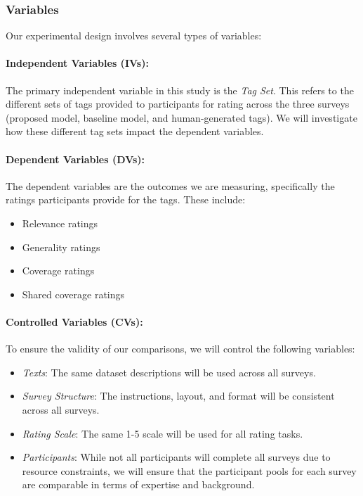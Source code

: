 \subsubsection{Variables}
Our experimental design involves several types of variables:

\paragraph{Independent Variables (IVs):}
The primary independent variable in this study is the \textit{Tag Set}. This refers to the different sets of tags provided to participants for rating across the three surveys (proposed model, baseline model, and human-generated tags). We will investigate how these different tag sets impact the dependent variables.

\paragraph{Dependent Variables (DVs):}
The dependent variables are the outcomes we are measuring, specifically the ratings participants provide for the tags. These include:
\begin{itemize}
\item Relevance ratings
\item Generality ratings
\item Coverage ratings
\item Shared coverage ratings
\end{itemize}

\paragraph{Controlled Variables (CVs):}
To ensure the validity of our comparisons, we will control the following variables:
\begin{itemize}
\item \textit{Texts}: The same dataset descriptions will be used across all surveys.
\item \textit{Survey Structure}: The instructions, layout, and format will be consistent across all surveys.
\item \textit{Rating Scale}: The same 1-5 scale will be used for all rating tasks.
\item \textit{Participants}: While not all participants will complete all surveys due to resource constraints, we will ensure that the participant pools for each survey are comparable in terms of expertise and background.
\end{itemize}


